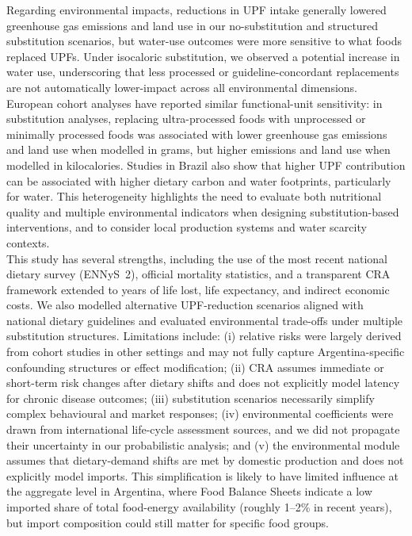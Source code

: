 \documentclass{article}
\begin{document}
Regarding environmental impacts, reductions in UPF intake generally lowered greenhouse gas emissions and land use in our no-substitution and structured substitution scenarios, but water-use outcomes were more sensitive to what foods replaced UPFs. Under isocaloric substitution, we observed a potential increase in water use, underscoring that less processed or guideline-concordant replacements are not automatically lower-impact across all environmental dimensions. European cohort analyses have reported similar functional-unit sensitivity: in substitution analyses, replacing ultra-processed foods with unprocessed or minimally processed foods was associated with lower greenhouse gas emissions and land use when modelled in grams, but higher emissions and land use when modelled in kilocalories.\cite{Berden2025EPIC} Studies in Brazil also show that higher UPF contribution can be associated with higher dietary carbon and water footprints, particularly for water.\cite{Garzillo2022RSP} This heterogeneity highlights the need to evaluate both nutritional quality and multiple environmental indicators when designing substitution-based interventions, and to consider local production systems and water scarcity contexts.\cite{Anastasiou2022JCP} \\

This study has several strengths, including the use of the most recent national dietary survey (ENNyS~2), official mortality statistics, and a transparent CRA framework extended to years of life lost, life expectancy, and indirect economic costs. We also modelled alternative UPF-reduction scenarios aligned with national dietary guidelines and evaluated environmental trade-offs under multiple substitution structures. Limitations include: (i) relative risks were largely derived from cohort studies in other settings and may not fully capture Argentina-specific confounding structures or effect modification; (ii) CRA assumes immediate or short-term risk changes after dietary shifts and does not explicitly model latency for chronic disease outcomes; (iii) substitution scenarios necessarily simplify complex behavioural and market responses; (iv) environmental coefficients were drawn from international life-cycle assessment sources, and we did not propagate their uncertainty in our probabilistic analysis;\cite{PooreNemecek2018,ADEMEAgribalyse2026} and (v) the environmental module assumes that dietary-demand shifts are met by domestic production and does not explicitly model imports. This simplification is likely to have limited influence at the aggregate level in Argentina, where Food Balance Sheets indicate a low imported share of total food-energy availability (roughly 1--2\% in recent years), but import composition could still matter for specific food groups.\cite{FAOSTATFBS2026} \\
\end{document}
